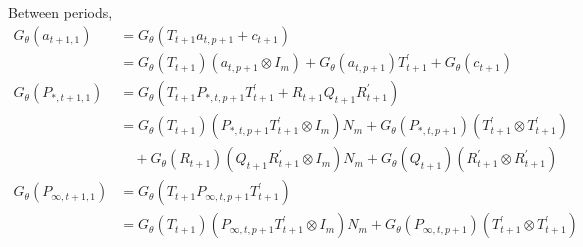 \documentclass[12pt]{article}
\newcommand{\Gt}{G_\theta}
\begin{document}
	Between periods, 
	\begin{align*}
	\Gt(a_{t+1,1}) &= \Gt(T_{t+1} a_{t,p+1} + c_{t+1}) \\
	&= \Gt(T_{t+1}) (a_{t,p+1} \otimes I_m) + \Gt(a_{t,p+1}) T_{t+1}^\prime + \Gt(c_{t+1})\\ 
	\Gt(P_{*,t+1,1}) &= \Gt(T_{t+1} P_{*,t,p+1} T_{t+1}^\prime + R_{t+1} Q_{t+1} R_{t+1}^\prime) \\
	&= \Gt(T_{t+1})(P_{*,t,p+1} T_{t+1}^\prime \otimes I_m) N_m + \Gt(P_{*,t,p+1})(T_{t+1}^\prime \otimes T_{t+1}^\prime) \\
	&\quad + \Gt(R_{t+1})(Q_{t+1} R_{t+1}^\prime \otimes I_m) N_m + \Gt(Q_{t+1})(R_{t+1}^\prime \otimes R_{t+1}^\prime) \\
	\Gt(P_{\infty,t+1,1}) &= \Gt(T_{t+1} P_{\infty,t,p+1} T_{t+1}^\prime) \\
	&= \Gt(T_{t+1})(P_{\infty,t,p+1} T_{t+1}^\prime \otimes I_m) N_m + \Gt(P_{\infty,t,p+1})(T_{t+1}^\prime \otimes T_{t+1}^\prime)
	\end{align*}
\end{document}
